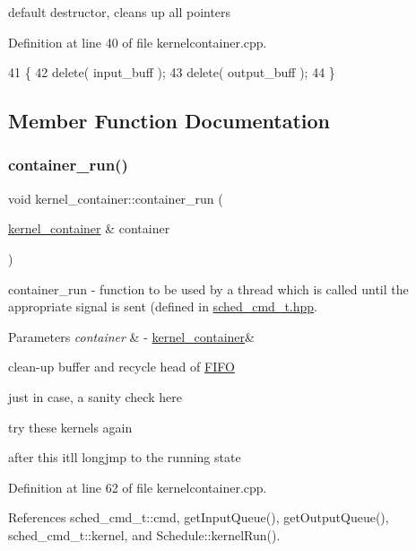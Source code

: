 default destructor, cleans up all pointers 

Definition at line 40 of file kernelcontainer.\+cpp.


\begin{DoxyCode}
41 \{
42    \textcolor{keyword}{delete}( input\_buff );
43    \textcolor{keyword}{delete}( output\_buff );
44 \}
\end{DoxyCode}


\subsection{Member Function Documentation}
\hypertarget{classkernel__container_a89f9b11119d9ab0e8c64215bf50856f0}{}\label{classkernel__container_a89f9b11119d9ab0e8c64215bf50856f0} 
\subsubsection{\texorpdfstring{container\+\_\+run()}{container\_run()}}
{\footnotesize\ttfamily void kernel\+\_\+container\+::container\+\_\+run (\begin{DoxyParamCaption}\item[{\hyperlink{classkernel__container}{kernel\+\_\+container} \&}]{container }\end{DoxyParamCaption})\hspace{0.3cm}{\ttfamily [static]}}

container\+\_\+run -\/ function to be used by a thread which is called until the appropriate signal is sent (defined in \hyperlink{sched__cmd__t_8hpp_source}{sched\+\_\+cmd\+\_\+t.\+hpp}. 
\begin{DoxyParams}{Parameters}
{\em container} & -\/ \hyperlink{classkernel__container}{kernel\+\_\+container}\& \\
\hline
\end{DoxyParams}
clean-\/up buffer and recycle head of \hyperlink{class_f_i_f_o}{F\+I\+FO}

just in case, a sanity check here

try these kernels again

after this it\textquotesingle{}ll longjmp to the running state 

Definition at line 62 of file kernelcontainer.\+cpp.



References sched\+\_\+cmd\+\_\+t\+::cmd, get\+Input\+Queue(), get\+Output\+Queue(), sched\+\_\+cmd\+\_\+t\+::kernel, and Schedule\+::kernel\+Run().


